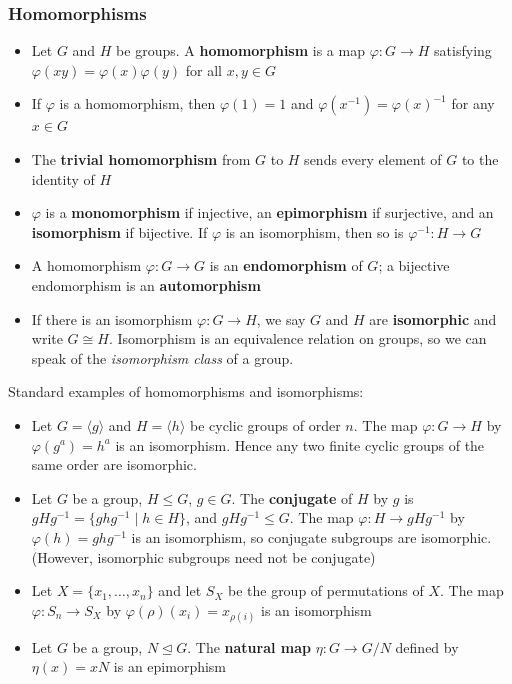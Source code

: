 \documentclass[../Odyssey_Project.tex]{subfiles}
\begin{document}
\subsubsection*{Homomorphisms}
\begin{itemize}
    \item Let \(G\) and \(H\) be groups. A \textbf{homomorphism} is a map \(\varphi \colon G \to H\) satisfying \(\varphi(xy) = \varphi(x)\varphi(y)\) for all \(x,y \in G\)
    \item If \(\varphi\) is a homomorphism, then \(\varphi(1) = 1\) and \(\varphi(x^{-1}) = \varphi(x)^{-1}\) for any \(x \in G\)
    \item The \textbf{trivial homomorphism} from \(G\) to \(H\) sends every element of \(G\) to the identity of \(H\)
    \item \(\varphi\) is a \textbf{monomorphism} if injective, an \textbf{epimorphism} if surjective, and an \textbf{isomorphism} if bijective. If \(\varphi\) is an isomorphism, then so is \(\varphi^{-1} : H \to G\)
    \item A homomorphism \(\varphi : G \to G\) is an \textbf{endomorphism} of \(G\); a bijective endomorphism is an \textbf{automorphism}
    \item If there is an isomorphism \(\varphi : G \to H\), we say \(G\) and \(H\) are \textbf{isomorphic} and write \(G \cong H\). Isomorphism is an equivalence relation on groups, so we can speak of the \emph{isomorphism class} of a group.
\end{itemize}
\noindent Standard examples of homomorphisms and isomorphisms:
\begin{itemize}
    \item Let \(G = \langle g \rangle\) and \(H = \langle h \rangle\) be cyclic groups of order \(n\). The map \(\varphi : G \to H\) by \(\varphi(g^a) = h^a\) is an isomorphism. Hence any two finite cyclic groups of the same order are isomorphic. 
    \item Let \(G\) be a group, \(H \leq G\), \(g \in G\). The \textbf{conjugate} of \(H\) by \(g\) is \(gHg^{-1} = \{ghg^{-1} \mid h \in H\}\), and \(gHg^{-1} \leq G\). The map \(\varphi : H \to gHg^{-1}\) by \(\varphi(h) = ghg^{-1}\) is an isomorphism, so conjugate subgroups are isomorphic. (However, isomorphic subgroups need not be conjugate)
    \item Let \(X = \{x_1, \dots, x_n\}\) and let \(S_X\) be the group of permutations of \(X\). The map \(\varphi : S_n \to S_X\) by \(\varphi(\rho)(x_i) = x_{\rho(i)}\) is an isomorphism
    \item Let \(G\) be a group, \(N \trianglelefteq G\). The \textbf{natural map} \(\eta : G \to G/N\) defined by \(\eta(x) = xN\) is an epimorphism
\end{itemize}
\end{document}
